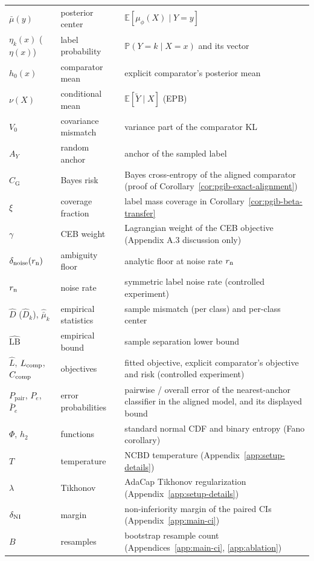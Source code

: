 \begin{center}
\begin{longtable}{l l p{7.5cm}}
$\bar\mu(y)$ & posterior center & $\mathbb E[\mu_\phi(X)\mid Y=y]$ \\
$\eta_k(x)$ ($\eta(x)$) & label probability & $\mathbb P(Y=k\mid X=x)$ and its vector \\
$h_0(x)$ & comparator mean & explicit comparator's posterior mean \\
$\nu(X)$ & conditional mean & $\mathbb E[\tilde Y\mid X]$ (EPB) \\
$V_0$ & covariance mismatch & variance part of the comparator KL \\
$A_Y$ & random anchor & anchor of the sampled label \\
$C_{\mathrm G}$ & Bayes risk & Bayes cross-entropy of the aligned comparator (proof of Corollary~\ref{cor:pgib-exact-alignment}) \\
$\xi$ & coverage fraction & label mass coverage in Corollary~\ref{cor:pgib-beta-transfer} \\
$\gamma$ & CEB weight & Lagrangian weight of the CEB objective (Appendix A.3 discussion only) \\
$\delta_{\rm noise}(r_{\rm n})$ & ambiguity floor & analytic floor at noise rate $r_{\rm n}$ \\
$r_{\rm n}$ & noise rate & symmetric label noise rate (controlled experiment) \\
$\widehat D$ ($\widehat D_k$), $\widehat{\bar\mu}_k$ & empirical statistics & sample mismatch (per class) and per-class center \\
$\widehat{\mathrm{LB}}$ & empirical bound & sample separation lower bound \\
$\widehat L$, $L_{\rm comp}$, $C_{\rm comp}$ & objectives & fitted objective, explicit comparator's objective and risk (controlled experiment) \\
$P_{\mathrm{pair}}$, $P_e$, $\bar P_e$ & error probabilities & pairwise / overall error of the nearest-anchor classifier in the aligned model, and its displayed bound \\
$\Phi$, $h_2$ & functions & standard normal CDF and binary entropy (Fano corollary) \\
$T$ & temperature & NCBD temperature (Appendix~\ref{app:setup-details}) \\
$\lambda$ & Tikhonov & AdaCap Tikhonov regularization (Appendix~\ref{app:setup-details}) \\
$\delta_{\rm NI}$ & margin & non-inferiority margin of the paired CIs (Appendix~\ref{app:main-ci}) \\
$B$ & resamples & bootstrap resample count (Appendices~\ref{app:main-ci}, \ref{app:ablation}) \\

\end{longtable}
\end{center}
